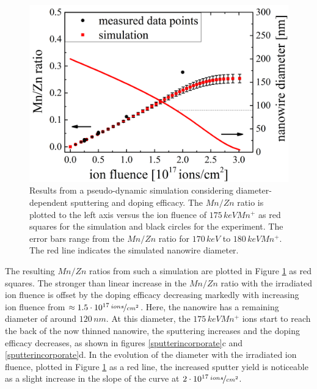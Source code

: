 \begin{figure}
	\centering
		\includegraphics[width=.5\textwidth]{images/pseudodynamic.png}
	\caption{Results from a pseudo-dynamic simulation considering diameter-dependent sputtering and doping efficacy. The $Mn/Zn$ ratio is plotted to the left axis versus the ion fluence of $175\,keV Mn^+$ as red squares for the simulation and black circles for the experiment. The error bars range from the $Mn/Zn$ ratio for $170\,keV$ to $180\,keV Mn^+$. The red line indicates the simulated nanowire diameter.}
	\label{pseudodynamic}
\end{figure} 

The resulting $Mn/Zn$ ratios from such a simulation are plotted in Figure \ref{pseudodynamic} as red squares. The stronger than linear increase in the $Mn/Zn$ ratio with the irradiated ion fluence is offset by the doping efficacy decreasing markedly with increasing ion fluence from $\approx 1.5\cdot 10^{17}\,\nicefrac{ions}{cm^2}$. Here, the nanowire has a remaining diameter of around $120\,nm$. At this diameter, the $175\,keV Mn^+$ ions start to reach the back of the now thinned nanowire, the sputtering increases and the doping efficacy decreases, as shown in figures \ref{sputterincorporate}c and \ref{sputterincorporate}d. In the evolution of the diameter with the irradiated ion fluence, plotted in Figure \ref{pseudodynamic} as a red line, the increased sputter yield is noticeable as a slight increase in the slope of the curve at $2\cdot 10^{17}\,\nicefrac{ions}{cm^2}$. 

